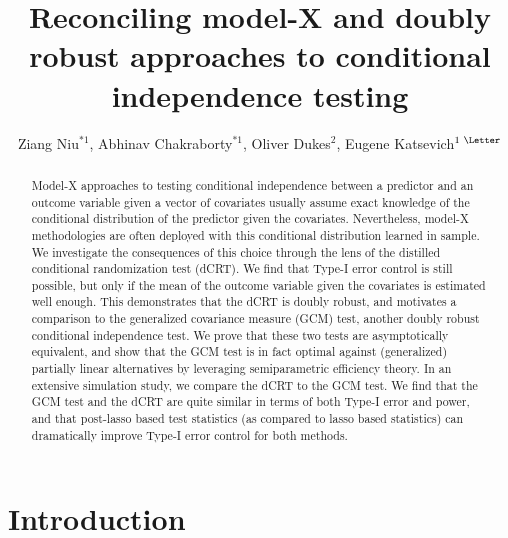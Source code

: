 \documentclass[12pt]{article}
\theoremstyle{definition}
\theoremstyle{remark}
\begin{document}
	
	
	
	
	\title{Reconciling model-X and doubly robust approaches to conditional independence testing}
	\author{Ziang Niu$^{*1}$, Abhinav Chakraborty$^{*1}$,
		Oliver Dukes$^2$, Eugene Katsevich$\textsuperscript{1 \Letter}$}
	
	
	\renewcommand{\thefootnote}{*} 
	\renewcommand{\thefootnote}{1}
	\renewcommand{\thefootnote}{2}
	\renewcommand{\thefootnote}{\Letter} 
	
	\maketitle
	\thispagestyle{empty}
	\begin{abstract}
		Model-X approaches to testing conditional independence between a predictor and an outcome variable given a vector of covariates usually assume exact knowledge of the conditional distribution of the predictor given the covariates. Nevertheless, model-X methodologies are often deployed with this conditional distribution learned in sample. We investigate the consequences of this choice through the lens of the distilled conditional randomization test (dCRT). We find that Type-I error control is still possible, but only if the mean of the outcome variable given the covariates is estimated well enough. This demonstrates that the dCRT is doubly robust, and motivates a comparison to the generalized covariance measure (GCM) test, another doubly robust conditional independence test. We prove that these two tests are asymptotically equivalent, and show that the GCM test is in fact optimal against (generalized) partially linear alternatives by leveraging semiparametric efficiency theory. In an extensive simulation study, we compare the dCRT to the GCM test. We find that the GCM test and the dCRT are quite similar in terms of both Type-I error and power, and that post-lasso based test statistics (as compared to lasso based statistics) can dramatically improve Type-I error control for both methods.
	\end{abstract}
	
	
	\section{Introduction}
	
\end{document}
